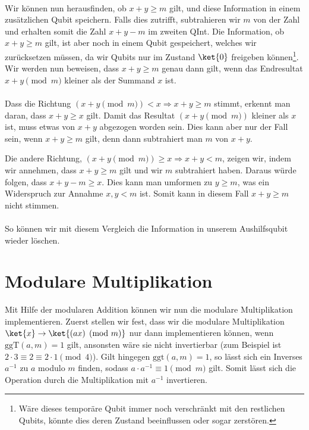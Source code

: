 \paragraph{}

Wir können nun herausfinden, ob $x + y \geq m$ gilt, und diese Information in einem zusätzlichen Qubit speichern. Falls dies zutrifft, subtrahieren wir $m$ von der Zahl und erhalten somit die Zahl $x + y - m$ im zweiten QInt. Die Information, ob $x + y \geq m$ gilt, ist aber noch in einem Qubit gespeichert, welches wir zurücksetzen müssen, da wir Qubits nur im Zustand $\ket{0}$ freigeben können\footnote{Wäre dieses temporäre Qubit immer noch verschränkt mit den restlichen Qubits, könnte dies deren Zustand beeinflussen oder sogar zerstören.}. Wir werden nun beweisen, dass $x + y \geq m$ genau dann gilt, wenn das Endresultat ${x + y \pmod{m}}$ kleiner als der Summand $x$ ist. 

\paragraph{}

Dass die Richtung $({x + y \pmod{m}}) < x \Rightarrow x + y \geq m$ stimmt, erkennt man daran, dass $x + y \geq x$ gilt. Damit das Resultat ${(x + y \pmod{m})}$ kleiner als $x$ ist, muss etwas von $x + y$ abgezogen worden sein. Dies kann aber nur der Fall sein, wenn $x + y \geq m$ gilt, denn dann subtrahiert man $m$ von $x + y$.

Die andere Richtung, $(x + y \pmod{m}) \geq x \Rightarrow x + y < m$, zeigen wir, indem wir annehmen, dass $x + y \geq m$ gilt und wir $m$ subtrahiert haben. Daraus würde folgen, dass $x + y - m \geq x$. Dies kann man umformen zu $y \geq m$, was ein Widerspruch zur Annahme $x, y < m$ ist. Somit kann in diesem Fall $x + y \geq m$ nicht stimmen.

\paragraph{}

\noindent So können wir mit diesem Vergleich die Information in unserem Aushilfsqubit wieder löschen.

\section{Modulare Multiplikation}
Mit Hilfe der modularen Addition können wir nun die modulare Multiplikation implementieren. Zuerst stellen wir fest, dass wir die modulare Multiplikation $\ket{x} \rightarrow \ket{(ax) \pmod{m}}$ nur dann implementieren können, wenn $\text{ggT}(a, m) = 1$ gilt, ansonsten wäre sie nicht invertierbar (zum Beispiel ist $2\cdot 3 \equiv 2 \equiv 2\cdot 1 \pmod{4}$). Gilt hingegen $\text{ggt}(a, m) = 1$, so lässt sich ein Inverses $a^{-1}$ zu $a$ modulo $m$ finden, sodass $a\cdot a^{-1} \equiv 1 \pmod{m}$ gilt. Somit lässt sich die Operation durch die Multiplikation mit $a^{-1}$ invertieren.

